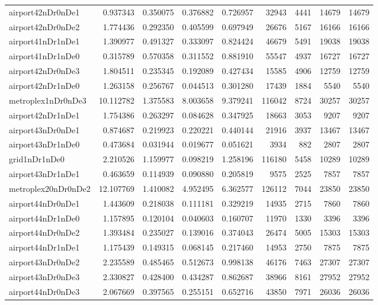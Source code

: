 \begin{longtable}{|l|r|r|r|r|r|r|r|r|}
airport42nDr0nDe1 & 0.937343 & 0.350075 & 0.376882 & 0.726957 & 32943 & 4441 & 14679 & 14679 \\
airport42nDr0nDe2 & 1.774436 & 0.292350 & 0.405599 & 0.697949 & 26676 & 5167 & 16166 & 16166 \\
airport41nDr1nDe1 & 1.390977 & 0.491327 & 0.333097 & 0.824424 & 46679 & 5491 & 19038 & 19038 \\
airport41nDr1nDe0 & 0.315789 & 0.570358 & 0.311552 & 0.881910 & 55547 & 4937 & 16727 & 16727 \\
airport42nDr0nDe3 & 1.804511 & 0.235345 & 0.192089 & 0.427434 & 15585 & 4906 & 12759 & 12759 \\
airport42nDr1nDe0 & 1.263158 & 0.256767 & 0.044513 & 0.301280 & 17439 & 1884 & 5540 & 5540 \\
metroplex1nDr0nDe3 & 10.112782 & 1.375583 & 8.003658 & 9.379241 & 116042 & 8724 & 30257 & 30257 \\
airport42nDr1nDe1 & 1.754386 & 0.263297 & 0.084628 & 0.347925 & 18663 & 3053 & 9207 & 9207 \\
airport43nDr0nDe1 & 0.874687 & 0.219923 & 0.220221 & 0.440144 & 21916 & 3937 & 13467 & 13467 \\
airport43nDr1nDe0 & 0.473684 & 0.031944 & 0.019677 & 0.051621 & 3934 & 882 & 2807 & 2807 \\
grid1nDr1nDe0 & 2.210526 & 1.159977 & 0.098219 & 1.258196 & 116180 & 5458 & 10289 & 10289 \\
airport43nDr1nDe1 & 0.463659 & 0.114939 & 0.090880 & 0.205819 & 9575 & 2525 & 7857 & 7857 \\
metroplex20nDr0nDe2 & 12.107769 & 1.410082 & 4.952495 & 6.362577 & 126112 & 7044 & 23850 & 23850 \\
airport44nDr0nDe1 & 1.443609 & 0.218038 & 0.111181 & 0.329219 & 14935 & 2715 & 7860 & 7860 \\
airport44nDr1nDe0 & 1.157895 & 0.120104 & 0.040603 & 0.160707 & 11970 & 1330 & 3396 & 3396 \\
airport44nDr0nDe2 & 1.393484 & 0.235027 & 0.139016 & 0.374043 & 26474 & 5005 & 15303 & 15303 \\
airport44nDr1nDe1 & 1.175439 & 0.149315 & 0.068145 & 0.217460 & 14953 & 2750 & 7875 & 7875 \\
airport43nDr0nDe2 & 2.235589 & 0.485465 & 0.512673 & 0.998138 & 46176 & 7463 & 27307 & 27307 \\
airport43nDr0nDe3 & 2.330827 & 0.428400 & 0.434287 & 0.862687 & 38966 & 8161 & 27952 & 27952 \\
airport44nDr0nDe3 & 2.067669 & 0.397565 & 0.255151 & 0.652716 & 43850 & 7971 & 26036 & 26036 \\

\end{longtable}

